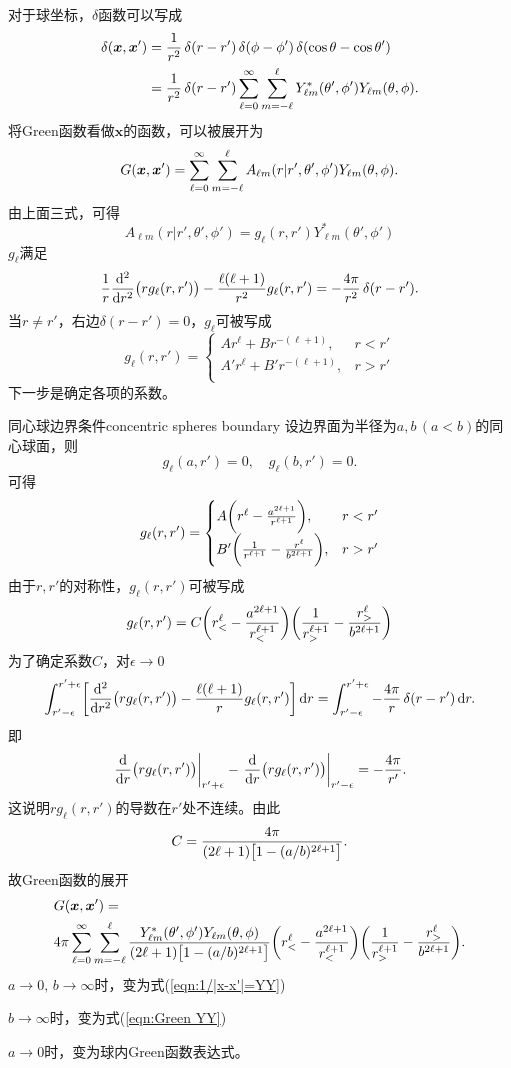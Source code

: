 对于球坐标，$\delta$函数可以写成
\begin{align*}
    \delta(\bm x,\bm x')&=\frac1{r^2}\vd(r-r')\vd(\phi-\phi')\vd(\cos\theta-\cos\theta')\\
    &=\frac1{r^2}\vd(r-r')\sum\fmto{\ell}0\sum_{m=-\ell}^\ell Y_{\ell m}^\ast(\theta',\phi')Y_{\ell m}(\theta,\phi).
\end{align*}
将Green函数看做$\bm x$的函数，可以被展开为
\[
    G(\bm x,\bm x')=\sum\fmto{\ell}0\sum_{m=-\ell}^\ell A_{\ell m}(r|r',\theta',\phi')Y_{\ell m}(\theta,\phi).
\]
由上面三式，可得 
\[
    A_{\ell m}(r|r',\theta',\phi')=g_\ell(r,r')Y_{\ell m}^\ast(\theta',\phi')
\]
$g_\ell$满足
\[
    \frac1r\dd[2]r\bigkh{rg_\ell(r,r')}-\frac{\ell(\ell+1)}{r^2}g_\ell(r,r')=-\frac{4\pi}{r^2}\vd(r-r').
\]
当$r\neq r'$，右边$\delta(r-r')=0$，$g_\ell$可被写成
\[
    g_\ell(r,r')=
    \begin{cases}
        Ar^\ell+Br^{-(\ell+1)},&r<r'\\
        A'r^\ell+B'r^{-(\ell+1)},&r>r'\\
    \end{cases}
\]
下一步是确定各项的系数。
\begin{example}{同心球边界条件}{concentric spheres boundary}
    设边界面为半径为$a,b\,(a<b)$的同心球面，则
    \[
        g_\ell(a,r')=0,\quad g_\ell(b,r')=0.
    \]
    可得
    \[
        g_\ell(r,r')=
        \begin{cases}
            A\biggkh{r^\ell-\frac{a^{2\ell+1}}{r^{\ell+1}}},&r<r'\\
            B'\biggkh{\frac1{r^{\ell+1}}-\frac{r^\ell}{b^{2\ell+1}}},&r>r'\\
        \end{cases}
    \]
    由于$r,r'$的对称性，$g_\ell(r,r')$可被写成 
    \[
        g_\ell(r,r')=C\biggkh{r_<^\ell-\frac{a^{2\ell+1}}{r_<^{\ell+1}}}\biggkh{\frac1{r_>^{\ell+1}}-\frac{r_>^\ell}{b^{2\ell+1}}}
    \]
    为了确定系数$C$，对$\epsilon\to0$
    \[
        \int_{r'-\epsilon}^{r'+\epsilon}\biggfkh{\dd[2]r\bigkh{rg_\ell(r,r')}-\frac{\ell(\ell+1)}{r}g_\ell(r,r')}\d r=\int_{r'-\epsilon}^{r'+\epsilon}-\frac{4\pi}r\vd(r-r')\d r.
    \]
    即
    \[
        \edg{\dd r\bigkh{rg_\ell(r,r')}}_{r'+\epsilon}-\edg{\dd r\bigkh{rg_\ell(r,r')}}_{r'-\epsilon}=-\frac{4\pi}{r'}.
    \]
    这说明$rg_\ell(r,r')$的导数在$r'$处不连续。由此
    \[
        C=\frac{4\pi}{(2\ell+1)\bigfkh{1-(a/b)^{2\ell+1}}}.
    \]
    故Green函数的展开
    \begin{equation}
        \begin{aligned}
            &G(\bm x,\bm x')=\\
            &4\pi\sum\fmto{\ell}0\sum_{m=-\ell}^\ell \frac{Y_{\ell m}^\ast(\theta',\phi')Y_{\ell m}(\theta,\phi)}{(2\ell+1)\bigfkh{1-(a/b)^{2\ell+1}}}\biggkh{r_<^\ell-\frac{a^{2\ell+1}}{r_<^{\ell+1}}}\biggkh{\frac1{r_>^{\ell+1}}-\frac{r_>^\ell}{b^{2\ell+1}}}.
        \end{aligned}
    \end{equation}
    \tcblower
    $a\to0,\,b\to\infty$时，变为式(\ref{eqn:1/|x-x'|=YY})

    $b\to\infty$时，变为式(\ref{eqn:Green YY})

    $a\to0$时，变为球内Green函数表达式。
\end{example}
